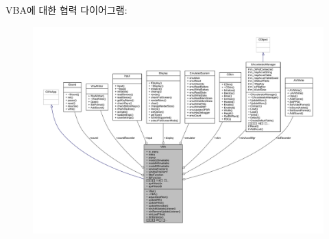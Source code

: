 V\+B\+A에 대한 협력 다이어그램\+:\nopagebreak
\begin{figure}[H]
\begin{center}
\leavevmode
\includegraphics[width=350pt]{class_v_b_a__coll__graph}
\end{center}
\end{figure}

